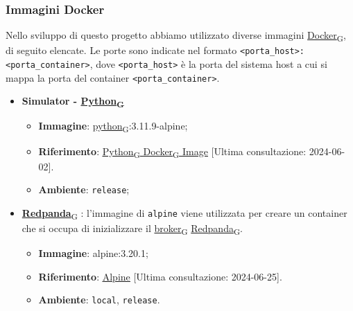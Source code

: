 \subsubsection{Immagini Docker}
Nello sviluppo di questo progetto abbiamo utilizzato diverse immagini \href{https://7last.github.io/docs/pb/documentazione-interna/glossario\#docker}{Docker\textsubscript{G}}, di seguito elencate.
Le porte sono indicate nel formato \texttt{<porta\_host>:<porta\_container>}, dove \texttt{<porta\_host>} è la porta del sistema host a cui si mappa la porta del container \texttt{<porta\_container>}.
\begin{itemize}
	\item \textbf{Simulator - \href{https://7last.github.io/docs/pb/documentazione-interna/glossario\#python}{Python\textsubscript{G}}}
	      \begin{itemize}
		      \item \textbf{Immagine}: \href{https://7last.github.io/docs/pb/documentazione-interna/glossario\#python}{python\textsubscript{G}}:3.11.9-alpine;
		      \item \textbf{Riferimento}: \underline{\href{https://hub.docker.com/_/python}{\href{https://7last.github.io/docs/pb/documentazione-interna/glossario\#python}{Python\textsubscript{G}} \href{https://7last.github.io/docs/pb/documentazione-interna/glossario\#docker}{Docker\textsubscript{G}} Image}} [Ultima consultazione: 2024-06-02].
		      \item \textbf{Ambiente}: \texttt{release};
	      \end{itemize}

	\item \href{https://7last.github.io/docs/pb/documentazione-interna/glossario\#redpanda}{\textbf{Redpanda}\textsubscript{G}}\textbf{ }:
	      l'immagine di \texttt{alpine} viene utilizzata per creare un container che si occupa di inizializzare il \href{https://7last.github.io/docs/pb/documentazione-interna/glossario\#broker}{broker\textsubscript{G}} \href{https://7last.github.io/docs/pb/documentazione-interna/glossario\#redpanda}{Redpanda\textsubscript{G}}.
	      \begin{itemize}
		      \item \textbf{Immagine}: alpine:3.20.1;
		      \item \textbf{Riferimento}: \underline{\href{https://hub.docker.com/_/alpine}{Alpine}} [Ultima consultazione: 2024-06-25].
		      \item \textbf{Ambiente}: \texttt{local}, \texttt{release}.
	      \end{itemize}


\end{itemize}
